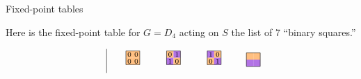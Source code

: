 \documentclass[8pt, handout]{beamer}
\begin{document}
\begin{frame}{Fixed-point tables}
  
    Here is the fixed-point table for $G = D_4$ acting on $S$ the list of 7 ``binary squares.''
    
    \[
    \renewcommand\arraystretch{1.8}
    \begin{tabular}{c|cccccccccccccc}
      && \begin{tikzpicture}[scale=.5]
           \tikzstyle{every node}=[font=\scriptsize]
           \path[fill=actOrange] (0,.5) rectangle ++(.5,.5); 
           \path[fill=actOrange] (.5,.5) rectangle ++(.5,.5);
           \path[fill=actOrange] (0,0) rectangle ++(.5,.5);
           \path[fill=actOrange] (.5,0) rectangle ++(.5,.5);
           \draw (.25,.75) node{$0$};\draw(.75,.75)node{$0$};
           \draw (.25,.25) node{$0$};\draw(.75,.25)node{$0$};
           \draw (0,0) rectangle (1,1); 
         \end{tikzpicture}
      && 
      \begin{tikzpicture}[scale=.5]
        \tikzstyle{every node}=[font=\scriptsize]
        \path[fill=actOrange] (0,.5) rectangle ++(.5,.5); 
        \path[fill=actPurple] (.5,.5) rectangle ++(.5,.5);
        \path[fill=actPurple] (0,0) rectangle ++(.5,.5);
        \path[fill=actOrange] (.5,0) rectangle ++(.5,.5);
        \draw (0,0) rectangle (1,1);
        \draw(.25,.75) node{$0$};\draw(.75,.75)node{$1$};
        \draw(.25,.25) node{$1$};\draw (.75,.25)node{$0$};
      \end{tikzpicture}
      &&
      \begin{tikzpicture}[scale=.5]
        \tikzstyle{every node}=[font=\scriptsize]
        \path[fill=actPurple] (3.5,.5) rectangle ++(.5,.5); 
        \path[fill=actOrange] (4,.5) rectangle ++(.5,.5);
        \path[fill=actOrange] (3.5,0) rectangle ++(.5,.5);
        \path[fill=actPurple] (4,0) rectangle ++(.5,.5);
        \draw (3.5,0) rectangle (4.5,1);
        \draw(3.75,.75) node{$1$};\draw(4.25,.75)node{$0$};
        \draw(3.75,.25) node{$0$};\draw (4.25,.25)node{$1$};
      \end{tikzpicture}
      &&
      \begin{tikzpicture}[scale=.5]
        \tikzstyle{every node}=[font=\scriptsize]
        \path[fill=actOrange] (0,.5) rectangle ++(.5,.5); 
        \path[fill=actOrange] (.5,.5) rectangle ++(.5,.5);
        \path[fill=actPurple] (0,0) rectangle ++(.5,.5);
        \path[fill=actPurple] (.5,0) rectangle ++(.5,.5);
        \draw (0,0) rectangle (1,1);

\end{tikzpicture}
\end{tabular}\]
\end{frame}
\end{document}
